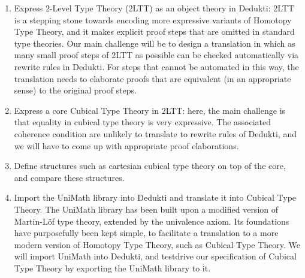 \begin{enumerate}
\item Express 2-Level Type Theory (2LTT) as an object theory in Dedukti: 2LTT is
  a stepping stone towards encoding more expressive variants of Homotopy Type
  Theory, and it makes explicit proof steps that are omitted in standard type
  theories. Our main challenge will be to design a translation in which as many
  small proof steps of 2LTT as possible can be checked automatically via rewrite
  rules in Dedukti. For steps that cannot be automated in this way, the
  translation needs to elaborate proofs that are equivalent (in an appropriate
  sense) to the original proof steps.
\item Express a core Cubical Type Theory in 2LTT: here, the main challenge is
  that equality in cubical type theory is very expressive. The associated
  coherence condition are unlikely to translate to rewrite rules of Dedukti, and
  we will have to come up with appropriate proof elaborations.
\item Define structures such as cartesian cubical type theory on top of the
  core, and compare these structures.
\item Import the UniMath library into Dedukti and translate it into Cubical Type Theory. The UniMath library has been built upon a modified version of Martin-Löf type theory, extended by the univalence axiom. Its foundations have purposefully been kept simple, to facilitate a translation to a more modern version of Homotopy Type Theory, such as Cubical Type Theory. We will import UniMath into Dedukti, and testdrive our specification of Cubical Type Theory by exporting the UniMath library to it.
\end{enumerate}
